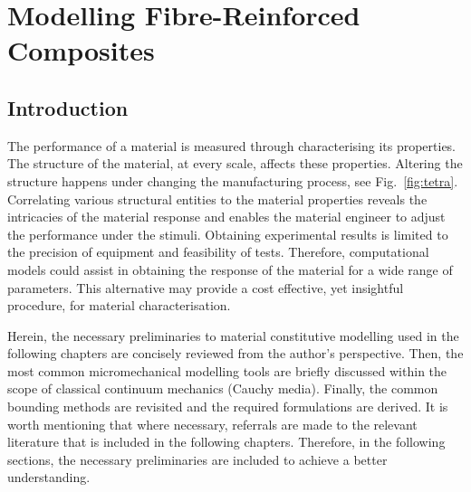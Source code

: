 


\chapter{Modelling Fibre-Reinforced Composites}\label{chap:math}

\section{Introduction}
	The performance of a material is measured through characterising its properties. The structure of the material, at every scale, affects these properties. Altering the structure happens under changing the manufacturing process, see Fig.~\ref{fig:tetra}. Correlating various structural entities to the material properties reveals the intricacies of the material response and enables the material engineer to adjust the performance under the stimuli. Obtaining experimental results is limited to the precision of equipment and feasibility of tests. Therefore, computational models could assist in obtaining the response of the material for a wide range of parameters. This alternative may provide a cost effective, yet insightful procedure, for material characterisation.
	
	Herein, the necessary preliminaries to material constitutive modelling used in the following chapters are concisely reviewed from the author's perspective. Then, the most common micromechanical modelling tools are briefly discussed within the scope of classical continuum mechanics (Cauchy media). Finally, the common bounding methods are revisited and the required formulations are derived. It is worth mentioning that where necessary, referrals are made to the relevant literature that is included in the following chapters. Therefore, in the following sections, the necessary preliminaries are included to achieve a better understanding.

